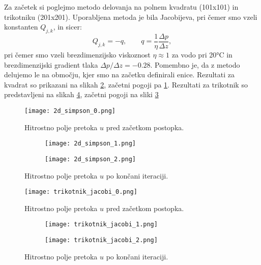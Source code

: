 \documentclass[12pt,a4paper]{article}
\begin{document}
Za začetek si poglejmo metodo delovanja na polnem kvadratu (101x101) in trikotniku (201x201). Uporabljena metoda je bila Jacobijeva, pri čemer smo vzeli konstanten $Q_{j,k}$, in sicer:
\begin{equation*}
Q_{j,k}=-q , \qquad q=\frac{1}{\eta} \frac{\Delta p}{\Delta z},
\end{equation*}
pri čemer smo vzeli brezdimenzijsko viskoznost $\eta \approx 1$ za vodo pri 20°C in brezdimenzijski gradient tlaka $\Delta p / \Delta z = -0.28$.
Pomembno je, da z metodo delujemo le na območju, kjer smo na začetku definirali enice. Rezultati za kvadrat so prikazani na slikah \ref{fig:slika3}, začetni pogoji pa \ref{fig:slika2}. Rezultati za trikotnik so predstavljeni na slikah \ref{fig:slika5}, začetni pogoji na sliki \ref{fig:slika4}

\begin{figure}[H]
\begin{center}
\texttt{[image: 2d\_simpson\_0.png]}
\caption{Hitrostno polje pretoka $u$ pred začetkom postopka.} \label{fig:slika2}
\end{center}
\end{figure}

\begin{figure}[H]
    \centering
    \begin{subfigure}[b]{0.49\textwidth}
        \texttt{[image: 2d\_simpson\_1.png]}
    \end{subfigure}
    \begin{subfigure}[b]{0.49\textwidth}
        \texttt{[image: 2d\_simpson\_2.png]}
    \end{subfigure}
    \caption{Hitrostno polje pretoka $u$ po končani iteraciji.} \label{fig:slika3}
\end{figure}

\begin{figure}[H]
\begin{center}
\texttt{[image: trikotnik\_jacobi\_0.png]}
\caption{Hitrostno polje pretoka $u$ pred začetkom postopka.} \label{fig:slika4}
\end{center}
\end{figure}

\begin{figure}[H]
    \centering
    \begin{subfigure}[b]{0.45\textwidth}
        \texttt{[image: trikotnik\_jacobi\_1.png]}
    \end{subfigure}
    \begin{subfigure}[b]{0.45\textwidth}
        \texttt{[image: trikotnik\_jacobi\_2.png]}
    \end{subfigure}
    \caption{Hitrostno polje pretoka $u$ po končani iteraciji.} \label{fig:slika5}
\end{figure}
\end{document}
